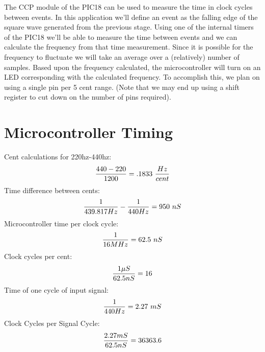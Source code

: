 \documentclass[12pt]{article}
\begin{document}
The CCP module of the PIC18 can be used to measure the time in clock cycles between events. In this
application we'll define an event as the falling edge of the square wave generated from the previous
stage. Using one of the internal timers of the PIC18 we'll be able to measure the time between events
and we can calculate the frequency from that time measurement. Since it is possible for the frequency
to fluctuate we will take an average over a (relatively) number of samples. Based upon the frequency
calculated, the microcontroller will turn on an LED corresponding with the calculated frequency. To
accomplish this, we plan on using a single pin per 5 cent range. (Note that we may end up using a shift
register to cut down on the number of pins required).

\section{Microcontroller Timing}
Cent calculations for 220hz-440hz:
\begin{equation}
{{440 - 220} \over 1200} = .1833 ~{Hz \over cent}
\end{equation}
Time difference between cents:
\begin{equation}
{1 \over 439.817 Hz} - {1 \over 440 Hz} = 950~nS
\end{equation}
Microcontroller time per clock cycle:
\begin{equation}
{1 \over 16 MHz} = 62.5~nS
\end{equation}
Clock cycles per cent:
\begin{equation}
{1\mu S \over 62.5 nS} = 16
\end{equation}
Time of one cycle of input signal:
\begin{equation}
{1 \over 440 Hz} = 2.27~mS
\end{equation}
Clock Cycles per Signal Cycle:
\begin{equation}
{2.27 mS \over 62.5 nS} = 36363.6
\end{equation}
\end{document}
